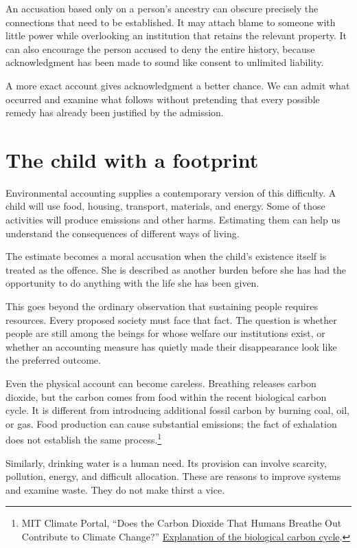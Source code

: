 \documentclass[12pt,a4paper]{book}
\begin{document}
An accusation based only on a person's ancestry can obscure precisely the connections that need to be established. It may attach blame to someone with little power while overlooking an institution that retains the relevant property. It can also encourage the person accused to deny the entire history, because acknowledgment has been made to sound like consent to unlimited liability.

A more exact account gives acknowledgment a better chance. We can admit what occurred and examine what follows without pretending that every possible remedy has already been justified by the admission.

\section*{The child with a footprint}

Environmental accounting supplies a contemporary version of this difficulty. A child will use food, housing, transport, materials, and energy. Some of those activities will produce emissions and other harms. Estimating them can help us understand the consequences of different ways of living.

The estimate becomes a moral accusation when the child's existence itself is treated as the offence. She is described as another burden before she has had the opportunity to do anything with the life she has been given.

This goes beyond the ordinary observation that sustaining people requires resources. Every proposed society must face that fact. The question is whether people are still among the beings for whose welfare our institutions exist, or whether an accounting measure has quietly made their disappearance look like the preferred outcome.

Even the physical account can become careless. Breathing releases carbon dioxide, but the carbon comes from food within the recent biological carbon cycle. It is different from introducing additional fossil carbon by burning coal, oil, or gas. Food production can cause substantial emissions; the fact of exhalation does not establish the same process.\footnote{MIT Climate Portal, ``Does the Carbon Dioxide That Humans Breathe Out Contribute to Climate Change?'' \href{https://climate.mit.edu/ask-mit/does-carbon-dioxide-humans-breathe-out-contribute-climate-change}{Explanation of the biological carbon cycle}.}

Similarly, drinking water is a human need. Its provision can involve scarcity, pollution, energy, and difficult allocation. These are reasons to improve systems and examine waste. They do not make thirst a vice.
\end{document}
